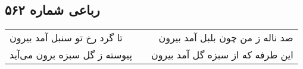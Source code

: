 \begin{center}
\section*{رباعی شماره ۵۶۲}
\label{sec:sh562}
\begin{longtable}{l p{0.5cm} r}
تا گرد رخ تو سنبل آمد بیرون
&&
صد ناله ز من چون بلبل آمد بیرون
\\
پیوسته ز گل سبزه برون می‌آید
&&
این طرفه که از سبزه گل آمد بیرون
\\
\end{longtable}
\end{center}

